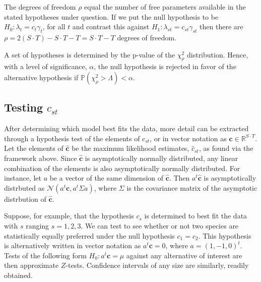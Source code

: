 The degrees of freedom $\rho$ equal the number of free parameters available in the stated hypotheses under question.  If we put the null hypothesis to be $H_0: \lambda_t = c_t \gamma_t$, for all $t$ and contrast this against $H_1: \lambda_{st} = c_{st}\gamma_{st}$ then there are $\rho = 2(S \cdot T) - S \cdot T - T = S \cdot T - T$ degrees of freedom.

A set of hypotheses is determined by the p-value of the $\chi^2_{\rho}$ distribution.  Hence, with a level of significance, $\alpha$, the null hypothesis is rejected in favor of the alternative hypothesis if $\mathbb{P}(\chi^2_{\rho} > \Lambda) < \alpha$.  

\subsection{Testing $c_{st}$}

After determining which model best fits the data, more detail can be extracted through a hypothesis test of the elements of $c_{st}$, or in vector notation as $\mathbf{c} \in \mathbb{R}^{S\cdot T}$.  Let the elements of $\hat{\mathbf{c}}$ be the maximum likelihood estimates, $\hat{c}_{st}$, as found via the framework above.  Since $\hat{\mathbf{c}}$ is asymptotically normally distributed, any linear combination of the elements is also asymptotically normally distributed.  For instance, let $a$ be a vector of the same dimension of $\hat{\mathbf{c}}$.  Then $a^t\hat{\mathbf{c}}$ is asymptotically distrbuted as $\mathcal{N}(a^t\mathbf{c}, a^t\Sigma a)$, where $\Sigma$ is the covariance matrix of the asymptotic distrbution of $\hat{\mathbf{c}}$.  

Suppose, for example, that the hypothesis $c_s$ is determined to best fit the data with $s$ ranging $s = 1, 2, 3$.  We can test to see whether or not two species are statistically equally preferred under the null hypothesis $c_{1} = c_{2}$.  This hypothesis is alternatively written in vector notation as $a^t\mathbf{c} = 0$, where $a = (1, -1, 0)^t$.  Tests of the following form $H_0: a^t\mathbf{c} = \mu$ against any alternative of interest are then approximate $Z$-tests.  Confidence intervals of any size are similarly, readily obtained. 

